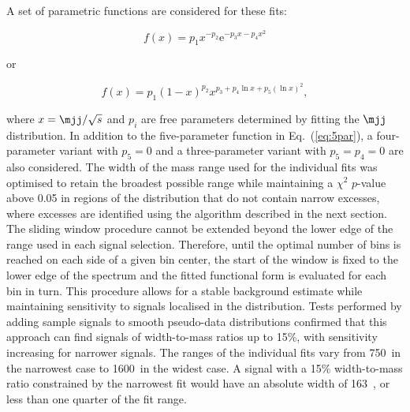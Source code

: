 A set of parametric functions are considered for these fits:%

\begin{equation}
f(x) = p_1 x^{-p_2} \mathrm{e}^{-  p_3  x - p_4  x^2}
\label{eq:ua2}
\end{equation}

or 

\begin{equation}
f(x) = p_1 (1 - x)^{p_2} x^{p_3 + p_4\ln x  + p_5(\ln x)^2} \label{eq:5par},
\end{equation}

\noindent
where $x = \mjj/\sqrt{s}$ and $p_i$ are free parameters determined by fitting the $\mjj$ distribution.
In addition to the five-parameter function in Eq.~(\ref{eq:5par}), a four-parameter variant with $p_5 = 0$ and a three-parameter variant with $p_5 = p_4 = 0$ are also considered.
The width of the mass range used for the individual fits was optimised to retain the broadest possible range while maintaining a $\chi^2$ $p$-value above 0.05 in regions of the distribution that do not contain narrow excesses, where excesses are identified using the \BumpHunter algorithm described in the next section. 
The sliding window procedure cannot be extended beyond the lower edge of the \mjj range used in each signal selection. 
Therefore, until the optimal number of bins is reached on each side of a given bin center, the start of the window is fixed to the lower edge of the spectrum and the fitted functional form is evaluated for each bin in turn. 
This procedure allows for a stable background estimate while maintaining sensitivity to signals localised in the \mjj distribution. 
Tests performed by adding sample signals to smooth pseudo-data distributions confirmed that this approach can find signals of width-to-mass ratios up to 15\%, with sensitivity increasing for narrower signals.  The ranges of the individual fits vary from 750~\GeV in the narrowest case to 1600~\GeV in the widest case. A signal with a 15\% width-to-mass ratio constrained by the narrowest fit would have an absolute width of 163~\GeV, or less than one quarter of the fit range.
 
